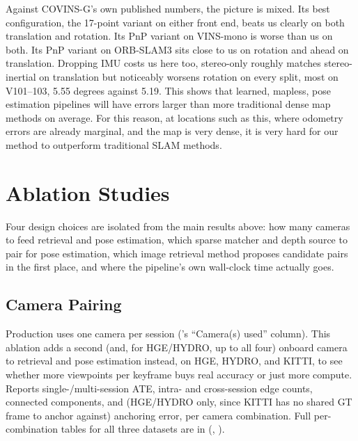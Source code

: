 Against COVINS-G's own published numbers, the picture is mixed. Its best configuration, the
17-point variant on either front end, beats us clearly on both translation and rotation. Its PnP
variant on VINS-mono is worse than us on both. Its PnP variant on ORB-SLAM3 sits close to us on
rotation and ahead on translation. Dropping IMU costs us here too, stereo-only roughly matches
stereo-inertial on translation but noticeably worsens rotation on every split, most on
V101--103, 5.55 degrees against 5.19. This shows that learned, mapless, pose estimation pipelines will have errors larger than more traditional dense map methods on average. For this reason, at locations such as this, where odometry errors are already marginal, and the map is very dense, it is very hard for our method to outperform traditional SLAM methods.

\section{Ablation Studies}
\label{sec:experiments-ablation}

Four design choices are isolated from the main results above: how many cameras to feed
retrieval and pose estimation, which sparse matcher and depth source to pair for pose estimation,
which image retrieval method proposes candidate pairs in the first place, and where the pipeline's
own wall-clock time actually goes.

\subsection{Camera Pairing}
\label{sec:experiments-ablation-cameras}

Production uses one camera per session ('s ``Camera(s) used''
column). This ablation adds a second (and, for HGE/HYDRO, up to all four) onboard camera to
retrieval and pose estimation instead, on HGE, HYDRO, and KITTI, to see whether more viewpoints
per keyframe buys real accuracy or just more compute. Reports single-/multi-session ATE, intra-
and cross-session edge counts, connected components, and (HGE/HYDRO only, since KITTI has no
shared GT frame to anchor against) anchoring error, per camera combination. Full per-combination
tables for all three datasets are in 
(, ).

